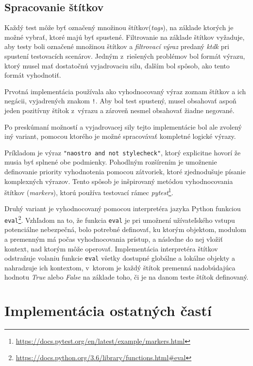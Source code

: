 \documentclass[
  digital, %
  oneside, %
  table,   %
  lof,     %
  lot,   %
]{fithesis3}
\newcommand*{\footurl}[1]{\footnote{\url{#1}}}
\begin{document}
\subsection{Spracovanie štítkov}

Každý test môže byť označený množinou štítkov(\emph{tags}), na základe ktorých je možné vybrať, ktoré majú byť spustené. Filtrovanie na základe štítkov vyžaduje, aby testy boli označené množinou štítkov a \emph{filtrovací výraz} predaný \emph{ktdk} pri spustení testovacích scenárov. Jedným z~riešených problémov bol formát výrazu, ktorý musel mať dostatočnú vyjadrovaciu silu, ďalším bol spôsob, ako tento formát vyhodnotiť. 

Prvotná implementácia používala ako vyhodnocovaný výraz zoznam štítkov a ich negácii, vyjadrených znakom \texttt{!}. Aby bol test spustený, musel obsahovať aspoň jeden pozitívny štítok z~výrazu a zároveň nesmel obsahovať žiadne negované.

Po preskúmaní možností a vyjadrovacej sily tejto implementácie bol ale zvolený iný variant, pomocou ktorého je možné spracovávať kompletné logické výrazy.

Príkladom je výraz \texttt{"naostro and not stylecheck"}, ktorý explicitne hovorí že musia byť splnené obe podmienky. Pohodlným rozšírením je umožnenie definovanie priority vyhodnotenia pomocou zátvoriek, ktoré zjednodušuje písanie komplexných výrazov. Tento spôsob je inšpirovaný metódou vyhodnocovania štítkov (\emph{markers}), ktorú používa testovací rámec \emph{pytest}\footurl{https://docs.pytest.org/en/latest/example/markers.html}.

Druhý variant je vyhodnocovaný pomocou interpretéra jazyka Python funkciou \texttt{eval}\footurl{https://docs.python.org/3.6/library/functions.html\#eval}. Vzhľadom na to, že funkcia \texttt{eval} je pri umožnení užívateľského vstupu potenciálne nebezpečná, bolo potrebné definovať, ku ktorým objektom, modulom a premenným má počas vyhodnocovania prístup, a následne do nej vložiť kontext, nad ktorým môže operovať. Implementácia interpretéra štítkov odstraňuje volaniu funkcie \texttt{eval} všetky dostupné globálne a lokálne objekty a nahradzuje ich kontextom, v~ktorom je každý štítok premenná nadobúdajúca hodnotu \emph{True} alebo \emph{False} na základe toho, či je na danom teste štítok definovaný. 

\section{Implementácia ostatných častí}
\end{document}
